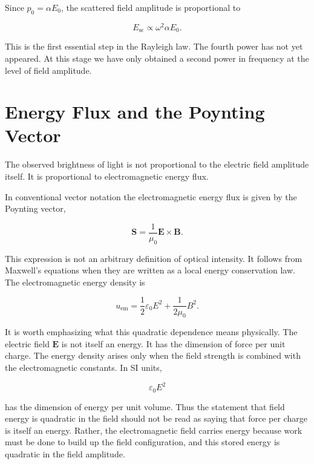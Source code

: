 \documentclass[11pt,a4paper]{article}
\begin{document}
Since \(p_0=\alpha E_0\), the scattered field amplitude is proportional to

\begin{equation}
E_{\mathrm{sc}} \propto \omega^2 \alpha E_0.
\end{equation}

This is the first essential step in the Rayleigh law. The fourth power has
not yet appeared. At this stage we have only obtained a second power in
frequency at the level of field amplitude.

\section{Energy Flux and the Poynting Vector}

The observed brightness of light is not proportional to the electric field
amplitude itself. It is proportional to electromagnetic energy flux.

In conventional vector notation the electromagnetic energy flux is given by
the Poynting vector,

\begin{equation}
\mathbf{S}
=
\frac{1}{\mu_0}\mathbf{E}\times\mathbf{B}.
\end{equation}

This expression is not an arbitrary definition of optical intensity. It follows
from Maxwell's equations when they are written as a local energy conservation
law. The electromagnetic energy density is

\begin{equation}
u_{\mathrm{em}}
=
\frac{1}{2}\varepsilon_0 E^2
+
\frac{1}{2\mu_0}B^2.
\end{equation}

It is worth emphasizing what this quadratic dependence means physically. The
electric field \(\mathbf{E}\) is not itself an energy. It has the dimension of
force per unit charge. The energy density arises only when the field strength
is combined with the electromagnetic constants. In SI units,

\begin{equation}
\varepsilon_0 E^2
\end{equation}

has the dimension of energy per unit volume. Thus the statement that field
energy is quadratic in the field should not be read as saying that force per
charge is itself an energy. Rather, the electromagnetic field carries energy
because work must be done to build up the field configuration, and this stored
energy is quadratic in the field amplitude.
\end{document}
